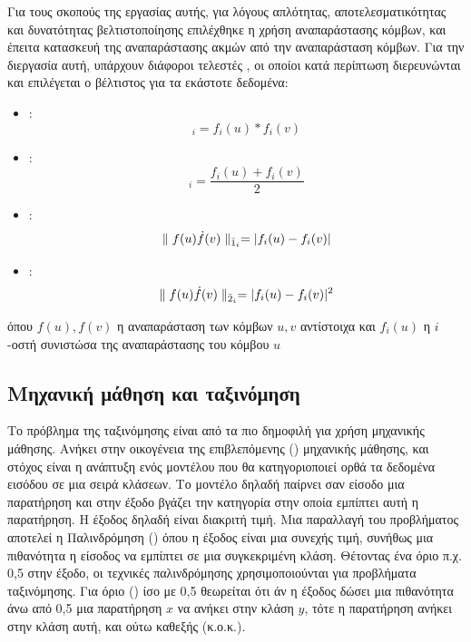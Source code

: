 Για τους σκοπούς της εργασίας αυτής, για λόγους απλότητας, αποτελεσματικότητας και δυνατότητας 
βελτιστοποίησης επιλέχθηκε η χρήση αναπαράστασης κόμβων, και έπειτα κατασκευή της
αναπαράστασης ακμών από την αναπαράσταση κόμβων. Για την διεργασία αυτή, υπάρχουν διάφοροι
τελεστές \cite{node2vec}, οι οποίοι κατά περίπτωση διερευνώνται και επιλέγεται ο βέλτιστος για
τα εκάστοτε δεδομένα:

\begin{itemize}
    \item {} : \begin{equation}
                            [f(u) \boxdot f(v)]_i = f_{i}(u) \ast f_{i}(v)
                          \end{equation} 
    \item {} : \begin{equation}
                            [f(u) \boxplus f(v)]_i = \frac{f_{i}(u) + f_{i}(v)}{2}   
                         \end{equation}
    \item {} : \begin{equation}
                                \parallel f(u) \dot f(v) \parallel_{\Bar{1}_{i}} = 
                                |f_{i}(u) - f_{i}(v)|
                            \end{equation}
    \item {} : \begin{equation}
                                \parallel f(u) \dot f(v) \parallel_{\Bar{2}_{i}} = 
                                |f_{i}(u) - f_{i}(v)|^2
                             \end{equation}
\end{itemize}

όπου \(f(u), f(v)\) η αναπαράσταση των κόμβων \(u, v\) αντίστοιχα και \(f_{i}(u)\) η 
\(i\)-οστή συνιστώσα της αναπαράστασης του κόμβου \(u\)


\subsection{Μηχανική μάθηση και ταξινόμηση}

Το πρόβλημα της ταξινόμησης είναι από τα πιο δημοφιλή για χρήση μηχανικής μάθησης. 
Ανήκει στην οικογένεια της επιβλεπόμενης () μηχανικής μάθησης, και στόχος
είναι η ανάπτυξη ενός μοντέλου που θα κατηγοριοποιεί ορθά τα δεδομένα εισόδου σε
μια σειρά κλάσεων. Το μοντέλο δηλαδή παίρνει σαν είσοδο μια παρατήρηση και στην έξοδο
βγάζει την κατηγορία στην οποία εμπίπτει αυτή η παρατήρηση. Η έξοδος δηλαδή είναι διακριτή
τιμή. Μια παραλλαγή του προβλήματος αποτελεί η Παλινδρόμηση ()
όπου η έξοδος είναι μια συνεχής τιμή, συνήθως μια πιθανότητα η είσοδος να εμπίπτει σε μια 
συγκεκριμένη κλάση. Θέτοντας ένα όριο π.χ. 0,5 στην έξοδο, οι τεχνικές παλινδρόμησης
χρησιμοποιούνται για προβλήματα ταξινόμησης. Για όριο () ίσο με 0,5 
θεωρείται ότι άν η έξοδος δώσει μια πιθανότητα άνω από 0,5 μια παρατήρηση \(x\) 
να ανήκει στην κλάση \(y\), τότε η παρατήρηση ανήκει στην κλάση αυτή, και ούτω καθεξής (κ.ο.κ.).

